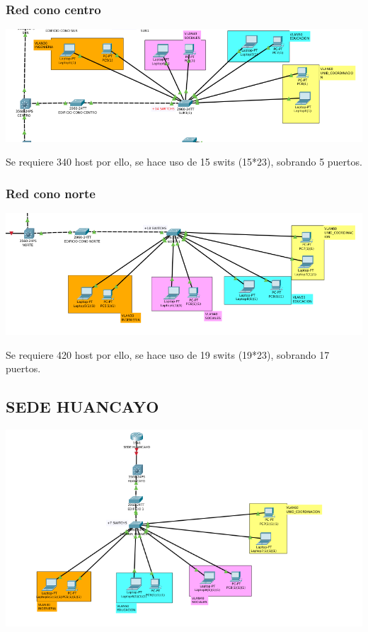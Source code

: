 \subsubsection{Red cono centro}
\includegraphics[scale=0.48]{img/CONOCENTRO.png} 
\begin{definicion}[]
{
Se requiere 340 host por ello, se hace uso de 15 swits (15*23), sobrando 5 puertos.
}
\end{definicion}


\subsubsection{Red cono norte}
\includegraphics[scale=0.48]{img/CONONORTE.png} 
\begin{definicion}[]
{
Se requiere 420 host por ello, se hace uso de 19 swits (19*23), sobrando 17 puertos.
}
\end{definicion}



\subsection{SEDE HUANCAYO}
\includegraphics[scale=0.6]{img/HUANCAYO.png} 

